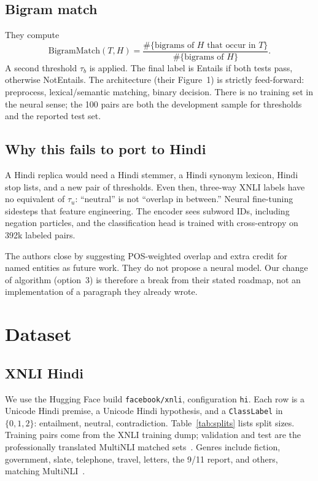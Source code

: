 \documentclass[conference]{IEEEtran}
\begin{document}
\subsection{Bigram match}
They compute
\begin{equation}
  \mathrm{BigramMatch}(T,H)
  = \frac{\#\{\text{bigrams of }H\text{ that occur in }T\}}{\#\{\text{bigrams of }H\}}.
\end{equation}
A second threshold $\tau_b$ is applied. The final label is Entails if both tests pass, otherwise NotEntails. The architecture (their Figure~1) is strictly feed-forward: preprocess, lexical/semantic matching, binary decision. There is no training set in the neural sense; the 100 pairs are both the development sample for thresholds and the reported test set.

\subsection{Why this fails to port to Hindi}
A Hindi replica would need a Hindi stemmer, a Hindi synonym lexicon, Hindi stop lists, and a new pair of thresholds. Even then, three-way XNLI labels have no equivalent of $\tau_u$: ``neutral'' is not ``overlap in between.'' Neural fine-tuning sidesteps that feature engineering. The encoder sees subword IDs, including negation particles, and the classification head is trained with cross-entropy on 392k labeled pairs.

The authors close by suggesting POS-weighted overlap and extra credit for named entities as future work. They do not propose a neural model. Our change of algorithm (option~3) is therefore a break from their stated roadmap, not an implementation of a paragraph they already wrote.

\section{Dataset}
\label{sec:data}

\subsection{XNLI Hindi}
We use the Hugging Face build \texttt{facebook/xnli}, configuration \texttt{hi}. Each row is a Unicode Hindi premise, a Unicode Hindi hypothesis, and a \texttt{ClassLabel} in $\{0,1,2\}$: entailment, neutral, contradiction. Table~\ref{tab:splits} lists split sizes. Training pairs come from the XNLI training dump; validation and test are the professionally translated MultiNLI matched sets~\citep{conneau2018xnli}. Genres include fiction, government, slate, telephone, travel, letters, the 9/11 report, and others, matching MultiNLI~\citep{williams2018snli}.
\end{document}
